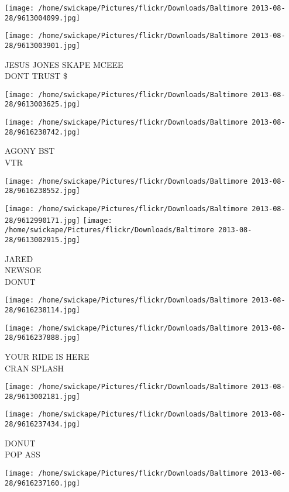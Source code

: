 \documentclass[10pt,letterpaper]{article}
\begin{document}
\texttt{[image: /home/swickape/Pictures/flickr/Downloads/Baltimore 2013-08-28/9613004099.jpg]}

\vspace{0.25in}
\texttt{[image: /home/swickape/Pictures/flickr/Downloads/Baltimore 2013-08-28/9613003901.jpg]}

JESUS JONES SKAPE MCEEE\\
DONT TRUST \$
\pagebreak

\texttt{[image: /home/swickape/Pictures/flickr/Downloads/Baltimore 2013-08-28/9613003625.jpg]}

\vspace{0.25in}
\texttt{[image: /home/swickape/Pictures/flickr/Downloads/Baltimore 2013-08-28/9616238742.jpg]}

AGONY BST\\
VTR
\pagebreak

\texttt{[image: /home/swickape/Pictures/flickr/Downloads/Baltimore 2013-08-28/9616238552.jpg]}

\vspace{0.25in}
\texttt{[image: /home/swickape/Pictures/flickr/Downloads/Baltimore 2013-08-28/9612990171.jpg]}
\texttt{[image: /home/swickape/Pictures/flickr/Downloads/Baltimore 2013-08-28/9613002915.jpg]}

JARED\\
NEWSOE\\
DONUT
\pagebreak

\texttt{[image: /home/swickape/Pictures/flickr/Downloads/Baltimore 2013-08-28/9616238114.jpg]}

\vspace{0.25in}
\texttt{[image: /home/swickape/Pictures/flickr/Downloads/Baltimore 2013-08-28/9616237888.jpg]}

YOUR RIDE IS HERE\\
CRAN SPLASH
\pagebreak

\texttt{[image: /home/swickape/Pictures/flickr/Downloads/Baltimore 2013-08-28/9613002181.jpg]}

\vspace{0.25in}
\texttt{[image: /home/swickape/Pictures/flickr/Downloads/Baltimore 2013-08-28/9616237434.jpg]}

DONUT\\
POP ASS
\pagebreak

\texttt{[image: /home/swickape/Pictures/flickr/Downloads/Baltimore 2013-08-28/9616237160.jpg]}
\end{document}
